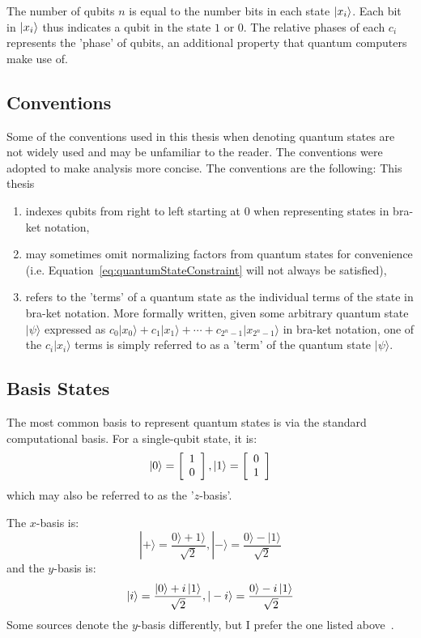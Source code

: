The number of qubits $n$ is equal to the number bits in each state $\ket{x_i}$. Each bit in $\ket{x_i}$ thus indicates a qubit in the state $1$ or $0$. The relative phases of each $c_i$ represents the 'phase' of qubits, an additional property that quantum computers make use of.

\subsection{Conventions}
Some of the conventions used in this thesis when denoting quantum states are not widely used and may be unfamiliar to the reader. The conventions were adopted to make analysis more concise. The conventions are the following: This thesis
\begin{enumerate}
    \item indexes qubits from right to left starting at 0 when representing states in bra-ket notation,
    \item may sometimes omit normalizing factors from quantum states for convenience (i.e. Equation~\eqref{eq:quantumStateConstraint} will not always be satisfied),
    \item refers to the 'terms' of a quantum state as the individual terms of the state in bra-ket notation. More formally written, given some arbitrary quantum state $|\psi\rangle$ expressed as $c_0|x_0\rangle + c_1|x_1\rangle + \cdots + c_{2^n - 1}|x_{2^n - 1}\rangle$ in bra-ket notation, one of the $c_i|x_i\rangle$ terms is simply referred to as a 'term' of the quantum state $|\psi\rangle$.
\end{enumerate}

\subsection{Basis States}
\label{subsection:basisStates}
The most common basis to represent quantum states is via the standard computational basis. For a single-qubit state, it is:
$$\ket{0} = \left[\begin{array}{c}
1 \\
0
\end{array}\right], \ket{1} = \left[\begin{array}{c}
0 \\
1
\end{array}\right]$$
which may also be referred to as the '$z$-basis'.

The $x$-basis is:
$$|+\rangle=\frac{0\rangle+1\rangle}{\sqrt{2}},|-\rangle=\frac{0\rangle-|1\rangle}{\sqrt{2}}$$
and the $y$-basis is:
$$|i\rangle=\frac{|0\rangle+i\ket{1}}{\sqrt{2}},|-i\rangle=\frac{0\rangle-i\ket{1}}{\sqrt{2}}$$
Some sources denote the $y$-basis differently, but I prefer the one listed above~\cite{basisStates}.

